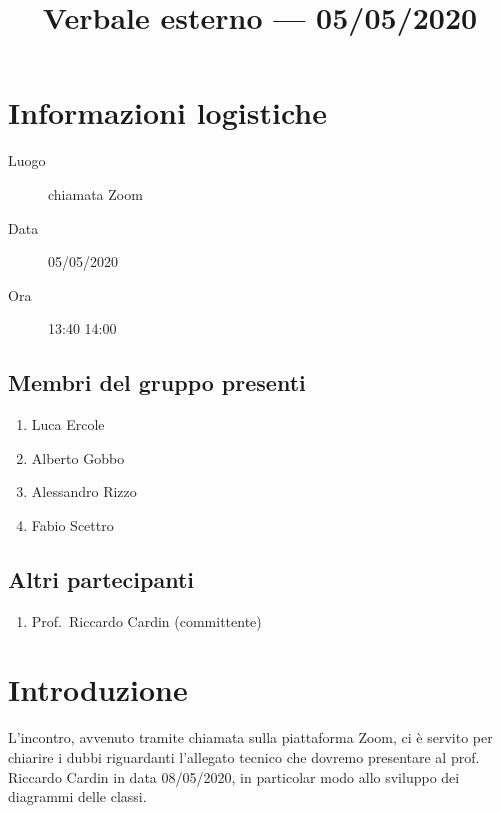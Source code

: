 \documentclass{article}
\title{Verbale esterno --- 05/05/2020}
\begin{document}


\section{Informazioni logistiche}%
\label{sec:informazioni_logistiche}

\begin{description}
  \item [Luogo] chiamata Zoom
  \item [Data] 05/05/2020
  \item [Ora] 13:40  14:00
\end{description}

\subsection{Membri del gruppo presenti}%
\label{sub:membri_del_gruppo_presenti}

\begin{enumerate}
  \item Luca Ercole
  \item Alberto Gobbo
  \item Alessandro Rizzo
  \item Fabio Scettro
\end{enumerate}

\subsection{Altri partecipanti}%
\label{sub:altri_partecipanti}

\begin{enumerate}
  \item Prof.\ Riccardo Cardin (committente)
\end{enumerate}

\section{Introduzione}%
\label{sec:introduzione}

L'incontro, avvenuto tramite chiamata sulla piattaforma Zoom, ci è servito per chiarire i dubbi riguardanti l'allegato tecnico che dovremo presentare al prof. Riccardo Cardin in data 08/05/2020, in particolar modo allo sviluppo dei diagrammi delle classi.
\end{document}
